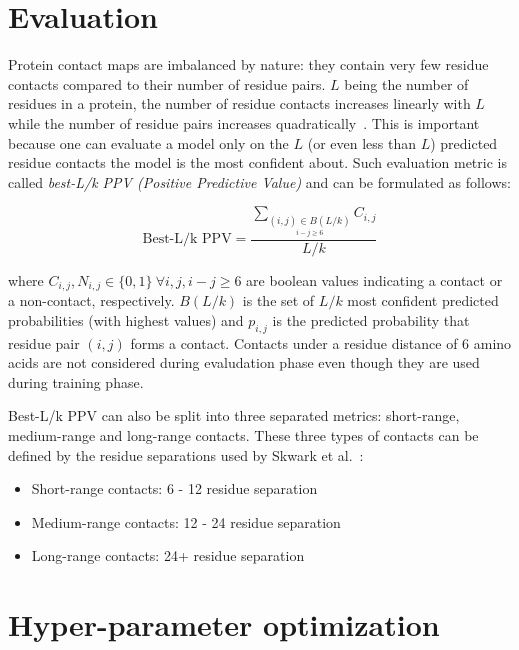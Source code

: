 \section{Evaluation}

  Protein contact maps are imbalanced by nature: they contain very few residue contacts compared to their number of residue pairs.
  $L$ being the number of residues in a protein, the number of residue contacts increases linearly with $L$ while the number of residue pairs
  increases quadratically~\cite{OLMEA1997S25}. This is important because one can evaluate a model only on the $L$ (or even less than $L$) predicted
  residue contacts the model is the most confident about. Such evaluation metric is called \textit{best-L/k PPV (Positive Predictive Value)}
  and can be formulated as follows:

  \begin{equation}
    \text{Best-L/k PPV} = \frac{\sum_{\underset {i-j \geq 6}{(i, j) \in B(L/k)}} C_{i, j}}{L/k}
  \end{equation}

  where $C_{i, j}, N_{i, j} \in \{0, 1\} \ \forall i, j, i-j \ge 6$ are boolean values indicating a contact or a non-contact, respectively.
  $B(L/k)$ is the set of $L/k$ most confident predicted probabilities (with highest values) and $p_{i, j}$ is the predicted probability
  that residue pair $(i, j)$ forms a contact.
  Contacts under a residue distance of 6 amino acids are not considered during evaludation phase even though they are used during
  training phase.

  Best-L/k PPV can also be split into three separated metrics: short-range, medium-range and long-range contacts.
  These three types of contacts can be defined by the residue separations used by Skwark et al.~\cite{10.1371/journal.pcbi.1003889}:

    \begin{itemize}
      \item Short-range contacts: 6 - 12 residue separation
      \item Medium-range contacts: 12 - 24 residue separation
      \item Long-range contacts: 24+ residue separation
    \end{itemize}

\section{Hyper-parameter optimization}

